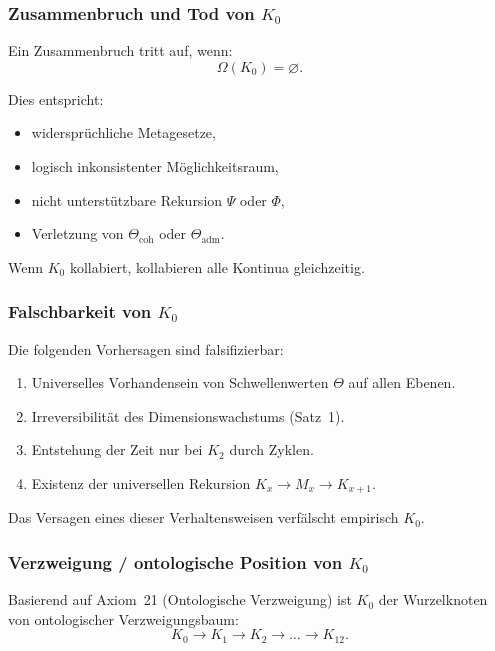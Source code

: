 \subsubsection{Zusammenbruch und Tod von \texorpdfstring{$K_0$}{K_0}}

Ein Zusammenbruch tritt auf, wenn:
\[
\Omega(K_0) = \varnothing.
\]

Dies entspricht:
\begin{itemize}
    \item widersprüchliche Metagesetze,
    \item logisch inkonsistenter Möglichkeitsraum,
    \item nicht unterstützbare Rekursion $\Psi$ oder $\Phi$,
    \item Verletzung von $\Theta_{\mathrm{coh}}$ oder $\Theta_{\mathrm{adm}}$.
\end{itemize}

Wenn $K_0$ kollabiert, kollabieren alle Kontinua gleichzeitig.

\subsubsection{Falschbarkeit von \texorpdfstring{$K_0$}{K_0}}

Die folgenden Vorhersagen sind falsifizierbar:
\begin{enumerate}
    \item Universelles Vorhandensein von Schwellenwerten $\Theta$ auf allen Ebenen.
    \item Irreversibilität des Dimensionswachstums (Satz~1).
    \item Entstehung der Zeit nur bei $K_2$ durch Zyklen.
    \item Existenz der universellen Rekursion $K_x\to M_x\to K_{x+1}$.
\end{enumerate}

Das Versagen eines dieser Verhaltensweisen verfälscht empirisch $K_0$.

\subsubsection{Verzweigung / ontologische Position von \texorpdfstring{$K_0$}{K_0}}

Basierend auf Axiom~21 (Ontologische Verzweigung) ist $K_0$ der Wurzelknoten von
ontologischer Verzweigungsbaum:
\[
K_0 \rightarrow K_1 \rightarrow K_2 \rightarrow \dots \rightarrow K_{12}.
\]

